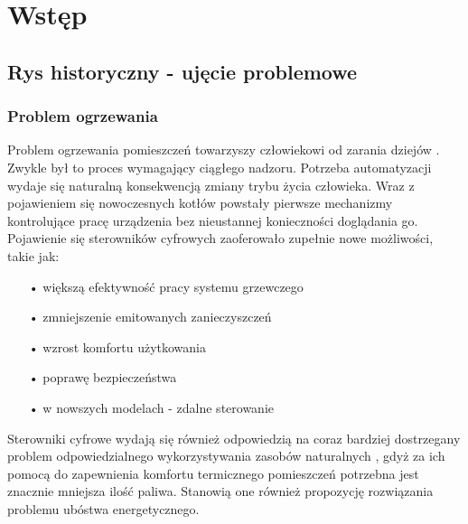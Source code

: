 \documentclass[11pt]{report}
\begin{document}
 \begin{titlepage}
 \vspace{0.1\textheight}
 \bigskip
 \vspace{0.3\textheight}
 \par

 \vspace{0.1\textheight}
 \end{titlepage}


 \tableofcontents


 \chapter{Wstęp}
 \section{Rys historyczny - ujęcie problemowe}
 \subsection{Problem ogrzewania}
 Problem ogrzewania pomieszczeń towarzyszy człowiekowi od zarania dziejów \cite{Hoppe2018}. Zwykle był to proces wymagający ciągłego nadzoru. Potrzeba automatyzacji wydaje się naturalną konsekwencją zmiany trybu życia człowieka. Wraz z pojawieniem się nowoczesnych kotłów powstały pierwsze mechanizmy kontrolujące pracę urządzenia bez nieustannej konieczności doglądania go.
 Pojawienie się sterowników cyfrowych zaoferowało zupełnie nowe możliwości, takie jak:
  \begin{enumerate}
 \item[•] większą efektywność pracy systemu grzewczego
 \item[•] zmniejszenie emitowanych zanieczyszczeń
 \item[•] wzrost komfortu użytkowania
 \item[•] poprawę bezpieczeństwa
 \item[•] w nowszych modelach - zdalne sterowanie
  \end{enumerate}
 Sterowniki cyfrowe wydają się również odpowiedzią na coraz bardziej dostrzegany problem odpowiedzialnego wykorzystywania zasobów naturalnych \cite{Mazurek2018}\cite{Mazurek2018a}, gdyż za ich pomocą do zapewnienia komfortu termicznego pomieszczeń potrzebna jest znacznie mniejsza ilość paliwa. Stanowią one również propozycję rozwiązania problemu ubóstwa energetycznego.
\end{document}
